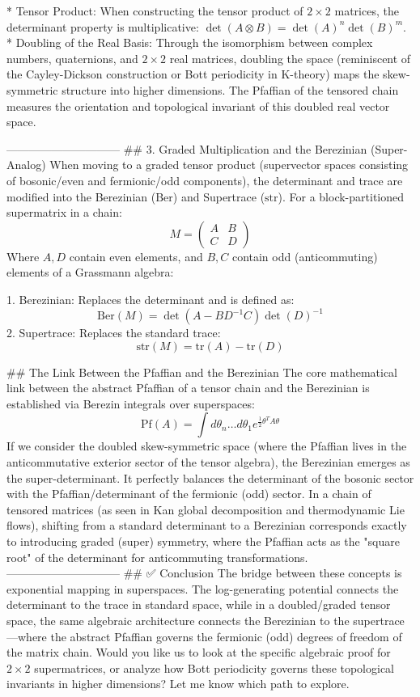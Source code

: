 * Tensor Product: When constructing the tensor product of $2 \times 2$ matrices, the determinant property is multiplicative: $\det(A \otimes B) = \det(A)^n \det(B)^m$.
* Doubling of the Real Basis: Through the isomorphism between complex numbers, quaternions, and $2 \times 2$ real matrices, doubling the space (reminiscent of the Cayley-Dickson construction or Bott periodicity in K-theory) maps the skew-symmetric structure into higher dimensions. The Pfaffian of the tensored chain measures the orientation and topological invariant of this doubled real vector space.

------------------------------
## 3. Graded Multiplication and the Berezinian (Super-Analog)
When moving to a graded tensor product (supervector spaces consisting of bosonic/even and fermionic/odd components), the determinant and trace are modified into the Berezinian ($\text{Ber}$) and Supertrace ($\text{str}$).
For a block-partitioned supermatrix in a chain:
$$M = \begin{pmatrix} A & B \\ C & D \end{pmatrix}$$ 
Where $A, D$ contain even elements, and $B, C$ contain odd (anticommuting) elements of a Grassmann algebra:

   1. Berezinian: Replaces the determinant and is defined as:
   $$\text{Ber}(M) = \det(A - BD^{-1}C)\det(D)^{-1}$$ 
   2. Supertrace: Replaces the standard trace:
   $$\text{str}(M) = \text{tr}(A) - \text{tr}(D)$$ 

## The Link Between the Pfaffian and the Berezinian
The core mathematical link between the abstract Pfaffian of a tensor chain and the Berezinian is established via Berezin integrals over superspaces:
$$\text{Pf}(A) = \int d\theta_n \dots d\theta_1 e^{\frac{1}{2}\theta^T A \theta}$$ 
If we consider the doubled skew-symmetric space (where the Pfaffian lives in the anticommutative exterior sector of the tensor algebra), the Berezinian emerges as the super-determinant. It perfectly balances the determinant of the bosonic sector with the Pfaffian/determinant of the fermionic (odd) sector.
In a chain of tensored matrices (as seen in Kan global decomposition and thermodynamic Lie flows), shifting from a standard determinant to a Berezinian corresponds exactly to introducing graded (super) symmetry, where the Pfaffian acts as the "square root" of the determinant for anticommuting transformations.
------------------------------
## ✅ Conclusion
The bridge between these concepts is exponential mapping in superspaces. The log-generating potential connects the determinant to the trace in standard space, while in a doubled/graded tensor space, the same algebraic architecture connects the Berezinian to the supertrace—where the abstract Pfaffian governs the fermionic (odd) degrees of freedom of the matrix chain.
Would you like us to look at the specific algebraic proof for $2 \times 2$ supermatrices, or analyze how Bott periodicity governs these topological invariants in higher dimensions? Let me know which path to explore.

